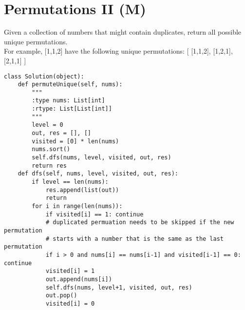 \section{Permutations II (M)}
Given a collection of numbers that might contain duplicates, return all possible unique permutations.\\

For example, [1,1,2] have the following unique permutations:
[
  [1,1,2],
  [1,2,1],
  [2,1,1]
] \\

\begin{lstlisting}
class Solution(object):
    def permuteUnique(self, nums):
        """
        :type nums: List[int]
        :rtype: List[List[int]]
        """
        level = 0
        out, res = [], []
        visited = [0] * len(nums) 
        nums.sort()
        self.dfs(nums, level, visited, out, res)
        return res
    def dfs(self, nums, level, visited, out, res):
        if level == len(nums):
            res.append(list(out))
            return
        for i in range(len(nums)):
            if visited[i] == 1: continue
            # duplicated permuation needs to be skipped if the new permutation
            # starts with a number that is the same as the last permutation
            if i > 0 and nums[i] == nums[i-1] and visited[i-1] == 0: continue
            visited[i] = 1
            out.append(nums[i])
            self.dfs(nums, level+1, visited, out, res)
            out.pop()
            visited[i] = 0
\end{lstlisting}

